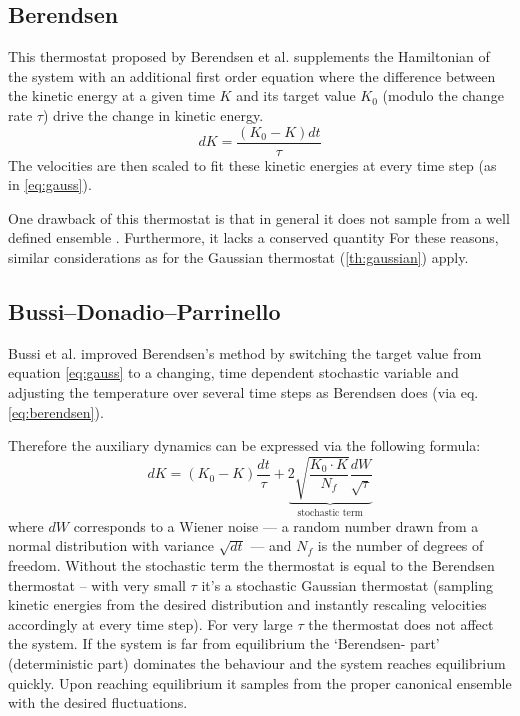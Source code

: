 \subsection{Berendsen}
This thermostat proposed by Berendsen et al. \cite{Berendsen1984} supplements the Hamiltonian of the system with an additional first order equation where the difference between the kinetic energy at a given time $K$ and its target value $K_0$ (modulo the change rate $\tau$) drive the change in kinetic energy.
\begin{equation}
{dK} = \frac{(K_0-K)dt}{\tau} \label{eq:berendsen}%
\end{equation}
The velocities are then scaled to fit these kinetic energies at every time step (as in \eqref{eq:gauss}).

One drawback of this thermostat is that in general it does not sample from a well defined ensemble \cite{Morishita2000}. Furthermore, it lacks a conserved quantity \cite{Bussi2007} For these reasons, similar considerations as for the Gaussian thermostat (\ref{th:gaussian}) apply.
\subsection{Bussi--Donadio--Parrinello}
Bussi et al.\cite{Bussi2007} improved Berendsen's method by switching the target value from equation \eqref{eq:gauss} to a changing, time dependent stochastic variable and adjusting the temperature over several time steps as Berendsen does (via eq. \eqref{eq:berendsen}). 

Therefore the auxiliary dynamics can be expressed via the following formula:
\begin{equation}
dK = (K_0- K) \frac{dt}{\tau} + \underbrace{2\sqrt{\frac{K_0\cdot K}{N_f}}\frac{dW}{\sqrt{\tau}}}_{\text{stochastic term}}
\end{equation}
where $dW$ corresponds to a Wiener noise --- a random number drawn from a normal distribution with variance $\sqrt{dt}$ --- and $N_f$ is the number of degrees of freedom. 
Without the stochastic term the thermostat is equal to the Berendsen thermostat -- with very small $\tau$ it's a stochastic Gaussian thermostat (sampling kinetic energies from the desired distribution and instantly rescaling velocities accordingly at every time step). For very large $\tau$ the thermostat does not affect the system. If the system is far from equilibrium the `Berendsen- part' (deterministic part) dominates the behaviour and the system reaches equilibrium quickly. Upon reaching equilibrium it samples from the proper canonical ensemble with the desired fluctuations.

